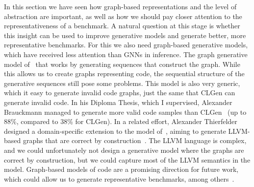 In this section we have seen how graph-based representations and the level of abstraction are important, as well as how we should pay closer attention to the representativeness of a benchmark.
A natural question at this stage is whether this insight can be used to improve generative models and generate better, more representative benchmarks.
For this we also need graph-based generative models, which have received less attention than \acp{GNN} in inference.
The graph generative model of~\cite{li2018learning} that works by generating sequences that construct the graph.
While this allows us to create graphs representing code, the sequential structure of the generative sequences still pose some problems.
This model is also very generic, which it easy to generate invalid code graphs, just the same that CLGen can generate invalid code.
In his Diploma Thesis, which I supervised, Alexander Brauckmann managed to generate more valid code samples than CLGen~\cite{Brauckmann-diplom20} (up to 88\%, compared to 38\% for CLGen).
In a related effort, Alexander Thierfelder designed a domain-specific extension to the model of~\cite{li2018learning}, aiming to generate LLVM-based graphs that are correct by construction~\cite{Thierfelder-master20}.
The LLVM language is complex, and we could unfortunately not design a generative model where the graphs are correct by construction, but we could capture most of the LLVM semantics in the model.
Graph-based models of code are a promising direction for future work, which could allow us to generate representative benchmarks, among others~\cite{leather_fdl20}.
